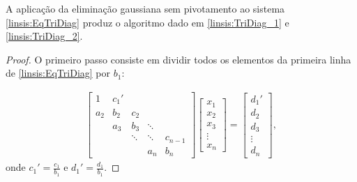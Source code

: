 \begin{teo} A aplicação da eliminação gaussiana sem pivotamento ao sistema \eqref{linsis:EqTriDiag} produz o algoritmo dado em \eqref{linsis:TriDiag_1} e \eqref{linsis:TriDiag_2}.
\end{teo}
\begin{proof}
O primeiro passo consiste em dividir todos os elementos da primeira linha de \eqref{linsis:EqTriDiag} por $b_1$:

\begin{eqnarray*} \begin{bmatrix}
   {1} & {c_1'} & {   } & {   } & {   } \\
   {a_2} & {b_2} & {c_2} & {   } & {   } \\
   {   } & {a_3} & {b_3} & \ddots & {   } \\
   {   } & {   } & \ddots & \ddots & {c_{n-1}}\\
   {   } & {   } & {   } & {a_n} & {b_n}
\end{bmatrix}
\begin{bmatrix}
   {x_1 }  \\
   {x_2 }  \\
   {x_3 }  \\
   \vdots   \\
   {x_n }
\end{bmatrix}
=
\begin{bmatrix}
   {d_1' }  \\
   {d_2 }  \\
   {d_3 }  \\
   \vdots   \\
   {d_n }
\end{bmatrix},
\end{eqnarray*}
onde $c_1'=\frac{c_1}{b_1}$ e $d_1'=\frac{d_1}{b_1}.$


\end{proof}

